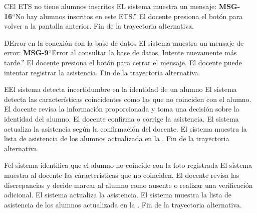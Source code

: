 \begin{UCtrayectoriaA}{C}{El ETS no tiene alumnos inscritos}
	\UCpaso EL sistema muestra un mensaje: {\bf MSG-16}{``No hay alumnos inscritos en este ETS.''}
	\UCpaso[\UCactor] El docente presiona el botón  para volver a la pantalla anterior.
	\UCpaso Fin de la trayectoria alternativa.
\end{UCtrayectoriaA}
\begin{UCtrayectoriaA}{D}{Error en la conexión con la base de datos}
	\UCpaso El sistema muestra un mensaje de error: {\bf MSG-9}{``Error al consultar la base de datos. Intente nuevamente más tarde.''}
	\UCpaso[\UCactor] El docente presiona el botón  para cerrar el mensaje.
	\UCpaso[\UCactor] El docente puede intentar registrar la asistencia.
	\UCpaso Fin de la trayectoria alternativa.
\end{UCtrayectoriaA}
\begin{UCtrayectoriaA}{E}{El sistema detecta incertidumbre en la identidad de un alumno}
	\UCpaso El sistema detecta las características coincidentes como las que no coinciden con el alumno.
	\UCpaso[\UCactor] El docente revisa la información proporcionada y toma una decisión sobre la identidad del alumno.
	\UCpaso[\UCactor] El docente confirma o corrige la asistencia.
	\UCpaso El sistema actualiza la asistencia según la confirmación del docente.
	\UCpaso El sistema muestra la lista de asistencia de los alumnos actualizada en la .
	\UCpaso Fin de la trayectoria alternativa.
\end{UCtrayectoriaA}
\begin{UCtrayectoriaA}{F}{el sistema identifica que el alumno no coincide con la foto registrada}
	\UCpaso El sistema muestra al docente las características que no coinciden.
	\UCpaso[\UCactor] El docente revisa las discrepancias y decide marcar al alumno como ausente o realizar una verificación adicional.
	\UCpaso El sistema actualiza la asistencia.
	\UCpaso El sistema muestra la lista de asistencia de los alumnos actualizada en la .
	\UCpaso Fin de la trayectoria alternativa.
\end{UCtrayectoriaA}

